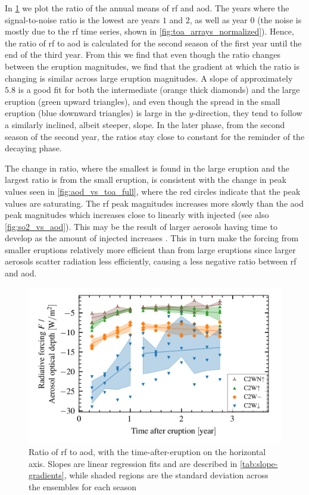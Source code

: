 \documentclass{ametsocV5}
\begin{document}
In \cref{fig:aod_vs_toa_avg_loop_ratio} we plot the ratio of the annual means of \ac{rf}
and \ac{aod}. The years where the signal-to-noise ratio is the lowest are years \(1\)
and \(2\), as well as year \(0\) (the noise is mostly due to the \ac{rf} time series,
shown in \cref{fig:toa_arrays_normalized}). Hence, the ratio of \ac{rf} to \ac{aod} is
calculated for the second season of the first year until the end of the third year. From
this we find that even though the ratio changes between the eruption magnitudes, we find
that the gradient at which the ratio is changing is similar across large eruption
magnitudes. A slope of approximately \(5.8\) is a good fit for both the intermediate
(orange thick diamonds) and the large eruption (green upward triangles), and even though
the spread in the small eruption (blue downward triangles) is large in the
\(y\)-direction, they tend to follow a similarly inclined, albeit steeper, slope. In the
later phase, from the second season of the second year, the ratios stay close to
constant for the reminder of the decaying phase.

The change in ratio, where the smallest is found in the large eruption and the largest
ratio is from the small eruption, is consistent with the change in peak values seen in
\cref{fig:aod_vs_toa_full}, where the red circles indicate that the peak values are
saturating. The \ac{rf} peak magnitudes increases more slowly than the \ac{aod} peak
magnitudes which increases close to linearly with injected  (see also
\cref{fig:so2_vs_aod}). This may be the result of larger aerosols having time to develop
as the amount of injected  increases \citep{niemeier2015,marshall2019}. This in
turn make the forcing from smaller eruptions relatively more efficient than from large
eruptions since larger aerosols scatter radiation less efficiently, causing a less
negative ratio between \ac{rf} and \ac{aod}.

\begin{figure}[t]
  \begin{center}
    \includegraphics[width=0.95\linewidth]{figures/aod_vs_toa_avg_loop_ratio.png}
  \end{center}
  \caption{
    Ratio of \ac{rf} to \ac{aod}, with the time-after-eruption on the horizontal axis.
    Slopes are linear regression fits and are described in \cref{tab:slope-gradients},
    while shaded regions are the standard deviation across the ensembles for each season
  }%
  \label{fig:aod_vs_toa_avg_loop_ratio}
\end{figure}
\end{document}

